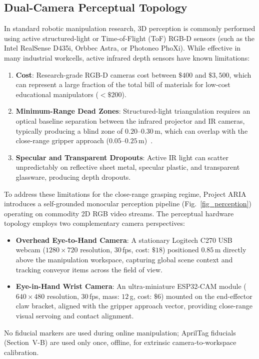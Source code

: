 \documentclass[journal]{IEEEtran}
\begin{document}
\subsection{Dual-Camera Perceptual Topology}
In standard robotic manipulation research, 3D perception is commonly performed using active structured-light or Time-of-Flight (ToF) RGB-D sensors (such as the Intel RealSense D435i, Orbbec Astra, or Photoneo PhoXi). While effective in many industrial workcells, active infrared depth sensors have known limitations:
\begin{enumerate}
    \item \textbf{Cost}: Research-grade RGB-D cameras cost between $\$400$ and $\$3{,}500$, which can represent a large fraction of the total bill of materials for low-cost educational manipulators ($<\$200$).
    \item \textbf{Minimum-Range Dead Zones}: Structured-light triangulation requires an optical baseline separation between the infrared projector and IR cameras, typically producing a blind zone of $0.20$--$0.30$\,m, which can overlap with the close-range gripper approach ($0.05$--$0.25$\,m)~\cite{aria_046_team_2024_cleardepth}.
    \item \textbf{Specular and Transparent Dropouts}: Active IR light can scatter unpredictably on reflective sheet metal, specular plastic, and transparent glassware, producing depth dropouts.
\end{enumerate}

To address these limitations for the close-range grasping regime, Project ARIA introduces a self-grounded monocular perception pipeline (Fig.~\ref{fig_perception}) operating on commodity 2D RGB video streams. The perceptual hardware topology employs two complementary camera perspectives:
\begin{itemize}
    \item \textbf{Overhead Eye-to-Hand Camera}: A stationary Logitech C270 USB webcam ($1280\times720$ resolution, $30$\,fps, cost: $\$18$) positioned $0.85$\,m directly above the manipulation workspace, capturing global scene context and tracking conveyor items across the field of view.
    \item \textbf{Eye-in-Hand Wrist Camera}: An ultra-miniature ESP32-CAM module ($640\times480$ resolution, $30$\,fps, mass: $12$\,g, cost: $\$6$) mounted on the end-effector claw bracket, aligned with the gripper approach vector, providing close-range visual servoing and contact alignment.
\end{itemize}
No fiducial markers are used during online manipulation; AprilTag fiducials (Section~V-B) are used only once, offline, for extrinsic camera-to-workspace calibration.
\end{document}
